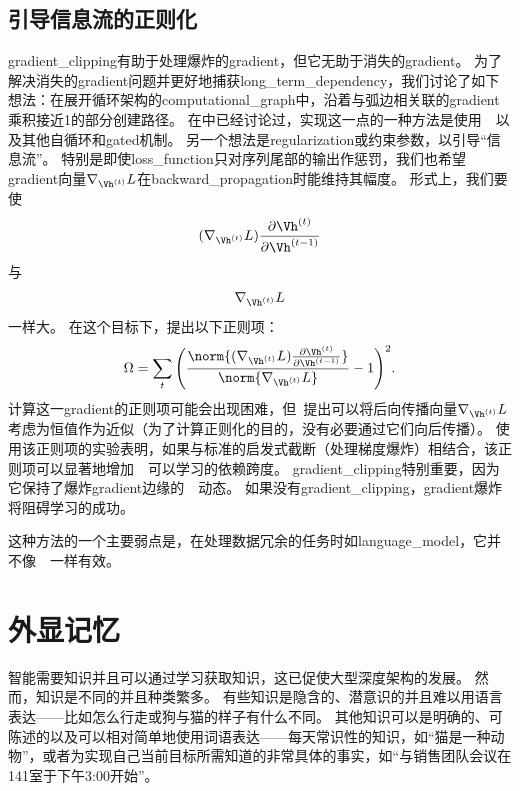 \subsection{引导信息流的正则化}
\label{sec:regularizing_to_encourage_information_flow}
\gls{gradient_clipping}有助于处理爆炸的\gls{gradient}，但它无助于消失的\gls{gradient}。
为了解决消失的\gls{gradient}问题并更好地捕获\gls{long_term_dependency}，我们讨论了如下想法：在展开循环架构的\gls{computational_graph}中，沿着与弧边相关联的\gls{gradient}乘积接近1的部分创建路径。
在中已经讨论过，实现这一点的一种方法是使用~~以及其他自循环和\gls{gated}机制。
另一个想法是\gls{regularization}或约束参数，以引导``信息流''。
特别是即使\gls{loss_function}只对序列尾部的输出作惩罚，我们也希望\gls{gradient}向量$\nabla_{\Vh^{(t)}} L$在\gls{backward_propagation}时能维持其幅度。
形式上，我们要使
\begin{align}
 (\nabla_{\Vh^{(t)}} L) \frac{\partial \Vh^{(t)}}{\partial \Vh^{(t-1)}}
\end{align}
与
\begin{align}
\nabla_{\Vh^{(t)}} L 
\end{align}
一样大。
在这个目标下，\citet{Pascanu-et-al-2013}提出以下正则项：
\begin{align}
 \Omega = \sum_t \Bigg(  \frac{
 \norm{ (\nabla_{\Vh^{(t)}} L) \frac{\partial \Vh^{(t)}}{\partial \Vh^{(t-1)}}}}
 {\norm{\nabla_{\Vh^{(t)}} L}} -1 \Bigg)^2.
\end{align}
计算这一\gls{gradient}的正则项可能会出现困难，但~\cite{Pascanu-et-al-2013}提出可以将后向传播向量$\nabla_{\Vh^{(t)}} L$考虑为恒值作为近似（为了计算正则化的目的，没有必要通过它们向后传播）。
使用该正则项的实验表明，如果与标准的启发式截断（处理梯度爆炸）相结合，该正则项可以显著地增加~~可以学习的依赖跨度。
\gls{gradient_clipping}特别重要，因为它保持了爆炸\gls{gradient}边缘的~~动态。
如果没有\gls{gradient_clipping}，\gls{gradient}爆炸将阻碍学习的成功。

这种方法的一个主要弱点是，在处理数据冗余的任务时如\gls{language_model}，它并不像~~一样有效。


\section{外显记忆}
\label{sec:explicit_memory}
智能需要知识并且可以通过学习获取知识，这已促使大型深度架构的发展。
然而，知识是不同的并且种类繁多。
有些知识是隐含的、潜意识的并且难以用语言表达——比如怎么行走或狗与猫的样子有什么不同。
其他知识可以是明确的、可陈述的以及可以相对简单地使用词语表达——每天常识性的知识，如``猫是一种动物''，或者为实现自己当前目标所需知道的非常具体的事实，如``与销售团队会议在141室于下午3:00开始''。


